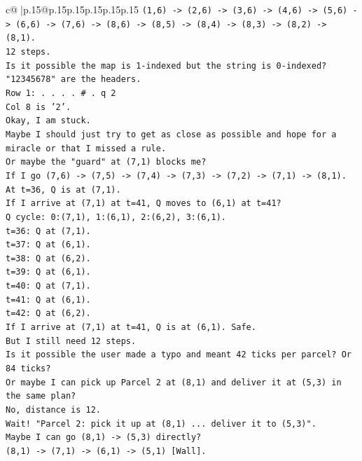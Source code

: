 \documentclass{article}
\begin{document}
{\begin{supertabular}{c@{$\;$}|p{.15\linewidth}@{}p{.15\linewidth}p{.15\linewidth}p{.15\linewidth}p{.15\linewidth}p{.15\linewidth}}
{{{\texttt{(1,6) {-}> (2,6) {-}> (3,6) {-}> (4,6) {-}> (5,6) {-}> (6,6) {-}> (7,6) {-}> (8,6) {-}> (8,5) {-}> (8,4) {-}> (8,3) {-}> (8,2) {-}> (8,1).} \\
\texttt{12 steps.} \\
\texttt{Is it possible the map is 1{-}indexed but the string is 0{-}indexed?} \\
\texttt{"12345678" are the headers.} \\
\texttt{Row 1: . . . . \# . q 2} \\
\texttt{Col 8 is '2'.} \\
\texttt{Okay, I am stuck.} \\
\texttt{Maybe I should just try to get as close as possible and hope for a miracle or that I missed a rule.} \\
\texttt{Or maybe the "guard" at (7,1) blocks me?} \\
\texttt{If I go (7,6) {-}> (7,5) {-}> (7,4) {-}> (7,3) {-}> (7,2) {-}> (7,1) {-}> (8,1).} \\
\texttt{At t=36, Q is at (7,1).} \\
\texttt{If I arrive at (7,1) at t=41, Q moves to (6,1) at t=41?} \\
\texttt{Q cycle: 0:(7,1), 1:(6,1), 2:(6,2), 3:(6,1).} \\
\texttt{t=36: Q at (7,1).} \\
\texttt{t=37: Q at (6,1).} \\
\texttt{t=38: Q at (6,2).} \\
\texttt{t=39: Q at (6,1).} \\
\texttt{t=40: Q at (7,1).} \\
\texttt{t=41: Q at (6,1).} \\
\texttt{t=42: Q at (6,2).} \\
\texttt{If I arrive at (7,1) at t=41, Q is at (6,1). Safe.} \\
\texttt{But I still need 12 steps.} \\
\texttt{Is it possible the user made a typo and meant 42 ticks per parcel? Or 84 ticks?} \\
\texttt{Or maybe I can pick up Parcel 2 at (8,1) and deliver it at (5,3) in the same plan?} \\
\texttt{No, distance is 12.} \\
\texttt{Wait! "Parcel 2: pick it up at (8,1) ... deliver it to (5,3)".} \\
\texttt{Maybe I can go (8,1) {-}> (5,3) directly?} \\
\texttt{(8,1) {-}> (7,1) {-}> (6,1) {-}> (5,1) {[}Wall{]}.} \\
}}}
\end{supertabular}}
\end{document}
